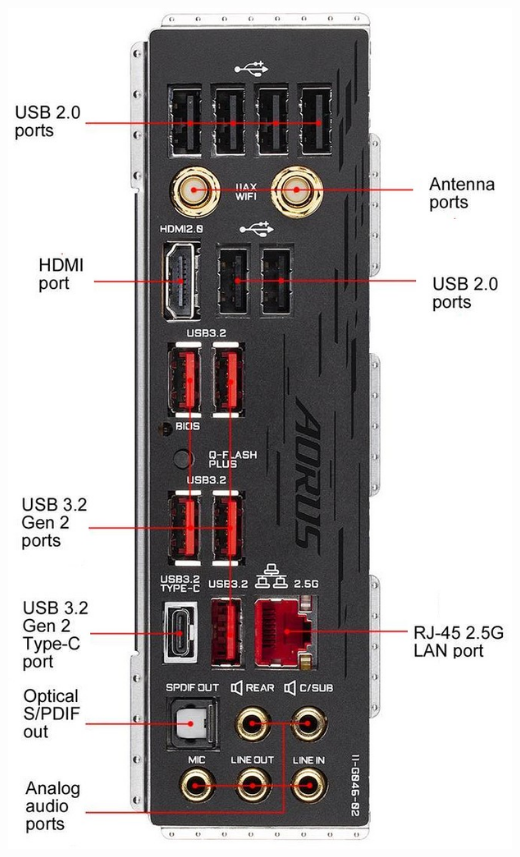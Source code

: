 \documentclass{article}
\begin{document}
\begin{itemize}
\begin{minipage}{\textwidth}
            \includegraphics[scale=0.4]{img/frontal_vertical.jpg}
          \end{minipage}
        \end{itemize}
\end{document}
